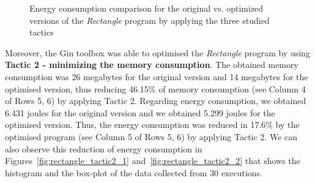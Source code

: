 \begin{figure}
{}
\caption{Energy consumption comparison for the original vs. optimized versions of the \textit{Rectangle} program by applying the three studied tactics}
\label{fig:graphsRectangle}
\end{figure}

\vspace{.5em}
Moreover, the Gin toolbox was able to optimised the \textit{Rectangle} program by using \textbf{Tactic 2 - minimizing the memory consumption}. The obtained memory consumption was 26 megabytes for the original version and 14 megabytes for the optimised version, thus reducing 46.15\% of memory consumption (see Column 4 of Rows 5, 6) by applying Tactic 2. 
Regarding energy consumption, we obtained 6.431 joules for the original version and we obtained 5.299 joules for the optimised version. Thus, the energy consumption was reduced in 17.6\% by the optimised program (see Column 5 of Rows 5, 6) by applying Tactic 2.
We can also observe this reduction of energy consumption in Figures~\ref{fig:rectangle_tactic2_1} and~\ref{fig:rectangle_tactic2_2} that shows the histogram and the box-plot of the data collected from 30 executions.

